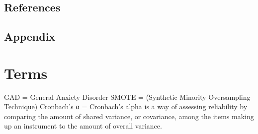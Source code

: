 \documentclass[12pt, english]{article}
\begin{document}
\section{References}
\printbibliography[heading=none] %
\section{Appendix}
\appendix
\chapter{Terms}
\centering
GAD = General Anxiety Disorder
SMOTE = (Synthetic Minority Oversampling Technique)
Cronbach’s α = Cronbach's alpha is a way of assessing reliability by comparing the amount of shared variance, or covariance, among the items making up an instrument to the amount of overall variance.
\end{document}
